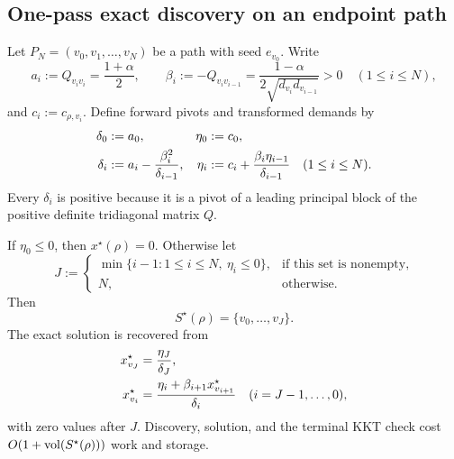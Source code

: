 \subsection{One-pass exact discovery on an endpoint path}
\label{subsec:path-schur-discovery}

Let $P_N=(v_0,v_1,\ldots,v_N)$ be a path with seed $e_{v_0}$.  Write
\begin{equation}
 a_i:=Q_{v_iv_i}=\frac{1+\alpha}{2},
 \qquad
 \beta_i:=-Q_{v_i v_{i-1}}
 =\frac{1-\alpha}{2\sqrt{d_{v_i}d_{v_{i-1}}}}>0
 \quad(1\leq i\leq N),
 \label{eq:path-schur-coefficients}
\end{equation}
and $c_i:=c_{\rho,v_i}$.  Define forward pivots and transformed demands by
\begin{align}
 \delta_0&:=a_0,
 &\eta_0&:=c_0,
 \notag\\
 \delta_i&:=a_i-\frac{\beta_i^2}{\delta_{i-1}},
 &\eta_i&:=c_i+\frac{\beta_i\eta_{i-1}}{\delta_{i-1}}
 \quad(1\leq i\leq N).
 \label{eq:path-forward-schur}
\end{align}
Every $\delta_i$ is positive because it is a pivot of a leading principal
block of the positive definite tridiagonal matrix $Q$.

\begin{theorem}
\label{thm:path-one-pass}
If $\eta_0\leq0$, then $x^\star(\rho)=0$.  Otherwise let
\begin{equation}
 J:=
 \begin{cases}
  \min\{i-1:1\leq i\leq N,\ \eta_i\leq0\},
    &\text{if this set is nonempty},\\
  N,&\text{otherwise}.
 \end{cases}
 \label{eq:path-boundary-index}
\end{equation}
Then
\begin{equation}
 S^\star(\rho)=\{v_0,\ldots,v_J\}.
 \label{eq:path-exact-support}
\end{equation}
The exact solution is recovered from
\begin{align}
 x_{v_J}^\star&=\frac{\eta_J}{\delta_J},
 \notag\\
 x_{v_i}^\star
 &=\frac{\eta_i+\beta_{i+1}x_{v_{i+1}}^\star}{\delta_i}
 \quad(i=J-1,\ldots,0),
 \label{eq:path-back-substitution}
\end{align}
with zero values after $J$.  Discovery, solution, and the terminal KKT check
cost $O(1+\operatorname{vol}(S^\star(\rho)))$ work and storage.
\end{theorem}

